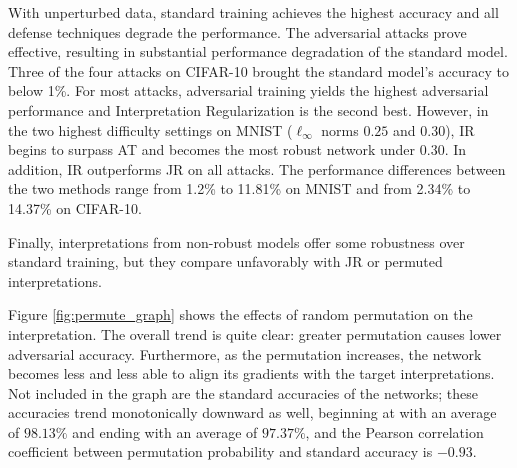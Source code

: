 With unperturbed data, standard training achieves the highest  accuracy and all defense techniques degrade the performance. The adversarial attacks prove effective, resulting in substantial performance degradation of the standard model. Three of the four attacks on CIFAR-10 brought the standard model's accuracy to below 1\%. For most attacks, adversarial training yields the highest adversarial performance and Interpretation Regularization is the second best. However, in the two highest difficulty settings on MNIST ($\ell_\infty$ norms $0.25$ and $0.30$), IR begins to surpass AT and becomes the most robust network under $0.30$. 
%
In addition, IR outperforms JR on all attacks. The performance differences between the two methods range from 1.2\% to 11.81\% on MNIST and from 2.34\% to 14.37\% on CIFAR-10. 

%
Finally, interpretations from non-robust models offer some robustness over standard training, but they compare unfavorably with JR or permuted interpretations. 

Figure \ref{fig:permute_graph} shows the effects of random permutation on the interpretation. The overall trend is quite clear: greater permutation causes lower adversarial accuracy. %
Furthermore, as the permutation increases, the network becomes less and less able to align its gradients with the target interpretations. Not included in the graph are the standard accuracies of the networks; these accuracies trend monotonically downward as well, beginning at with an average of $98.13\%$ and ending with an average of $97.37\%$, and the Pearson correlation coefficient between permutation probability and standard accuracy is $-0.93$.



